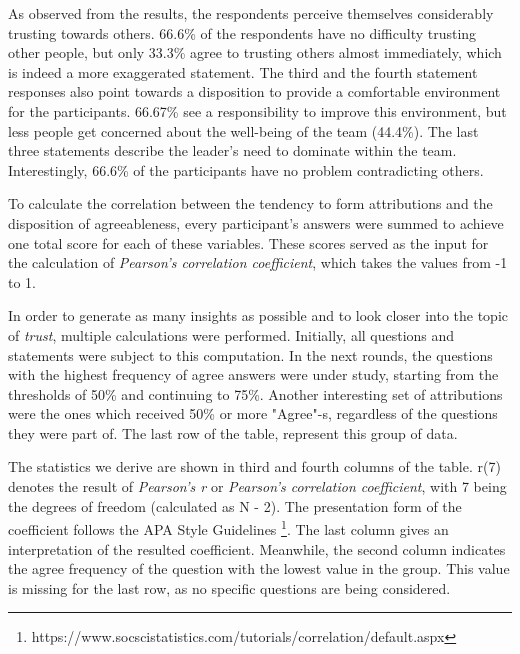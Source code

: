 As observed from the results, the respondents perceive themselves considerably trusting towards others. 66.6\% of the respondents have no difficulty trusting other people, but only 33.3\% agree to trusting others almost immediately, which is indeed a more exaggerated statement. The third and the fourth statement responses also point towards a disposition to provide a comfortable environment for the participants. 66.67\% see a responsibility to improve this environment, but less people get concerned about the well-being of the team (44.4\%). The last three statements describe the leader's need to dominate within the team. Interestingly, 66.6\% of the participants have no problem contradicting others.

To calculate the correlation between the tendency to form attributions and the disposition of agreeableness, every participant's answers were summed to achieve one total score for each of these variables. These scores served as the input for the calculation of \textit{Pearson's correlation coefficient}, which takes the values from -1 to 1. 

In order to generate as many insights as possible and to look closer into the topic of \textit{trust}, multiple calculations were performed. Initially, all questions and statements were subject to this computation. In the next rounds, the questions with the highest frequency of agree answers were under study, starting from the thresholds of 50\% and continuing to 75\%. Another interesting set of attributions were the ones which received 50\% or more "Agree"-s, regardless of the questions they were part of. The last row of the table, represent this group of data.

The statistics we derive are shown in third and fourth columns of the table. r(7) denotes the result of \textit{Pearson's r} or \textit{Pearson's correlation coefficient}, with 7 being the degrees of freedom (calculated as N - 2). The presentation form of the coefficient follows the APA Style Guidelines \footnote{https://www.socscistatistics.com/tutorials/correlation/default.aspx}. The last column gives an interpretation of the resulted coefficient. Meanwhile, the second column indicates the  agree frequency of the question with the lowest value in the group. This value is missing for the last row, as no specific questions are being considered.

